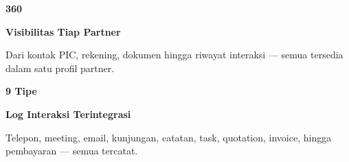 \documentclass[a4paper]{article}
\begin{document}
\begin{minipage}[t]{0.485\textwidth}
    \noindent\colorbox{BlueBg}{%
        \begin{minipage}[t][2.7cm][c]{\dimexpr\linewidth-2\fboxsep\relax}
            \centering
            {\fontsize{20}{24}\selectfont\bfseries\color{RosePrimary} 360\textdegree}\par\vspace{2pt}
            {\fontsize{9.5}{12}\selectfont\bfseries\color{BlueDark} Visibilitas Tiap Partner}\par\vspace{2pt}
            {\fontsize{8.5}{11}\selectfont\color{TextDark}Dari kontak PIC, rekening, dokumen hingga riwayat interaksi — semua tersedia dalam satu profil partner.}
        \end{minipage}}\par
    \vspace{6pt}
    \noindent\colorbox{BlueBg}{%
        \begin{minipage}[t][2.7cm][c]{\dimexpr\linewidth-2\fboxsep\relax}
            \centering
            {\fontsize{20}{24}\selectfont\bfseries\color{RosePrimary} 9 Tipe}\par\vspace{2pt}
            {\fontsize{9.5}{12}\selectfont\bfseries\color{BlueDark} Log Interaksi Terintegrasi}\par\vspace{2pt}
            {\fontsize{8.5}{11}\selectfont\color{TextDark}Telepon, meeting, email, kunjungan, catatan, task, quotation, invoice, hingga pembayaran — semua tercatat.}
        \end{minipage}}%
\end{minipage}

\vspace{8pt}
\end{document}
